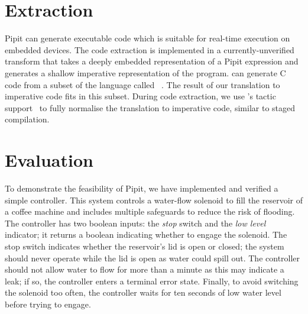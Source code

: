\documentclass[sigplan,screen, review]{acmart}
\begin{document}
\section{Extraction}
\label{s:extraction}

Pipit can generate executable code which is suitable for real-time execution on embedded devices.
The code extraction is implemented in a currently-unverified transform that takes a deeply embedded representation of a Pipit expression and generates a shallow imperative representation of the program.
\fstar{} can generate C code from a subset of the language called \lowstar{}~\cite{protzenko2017verified}.
The result of our translation to imperative code fits in this subset.
During code extraction, we use \fstar{}'s tactic support~\cite{martinez2019meta} to fully normalise the translation to imperative code, similar to staged compilation.






\section{Evaluation}
\label{s:coffee-machine}

To demonstrate the feasibility of Pipit, we have implemented and verified a simple controller.
This system controls a water-flow solenoid to fill the reservoir of a coffee machine and includes multiple safeguards to reduce the risk of flooding.
The controller has two boolean inputs: the \emph{stop} switch and the \emph{low level} indicator; it returns a boolean indicating whether to engage the solenoid.
The stop switch indicates whether the reservoir's lid is open or closed; the system should never operate while the lid is open as water could spill out.
The controller should not allow water to flow for more than a minute as this may indicate a leak; if so, the controller enters a terminal error state.
Finally, to avoid switching the solenoid too often, the controller waits for ten seconds of low water level before trying to engage.
\end{document}
